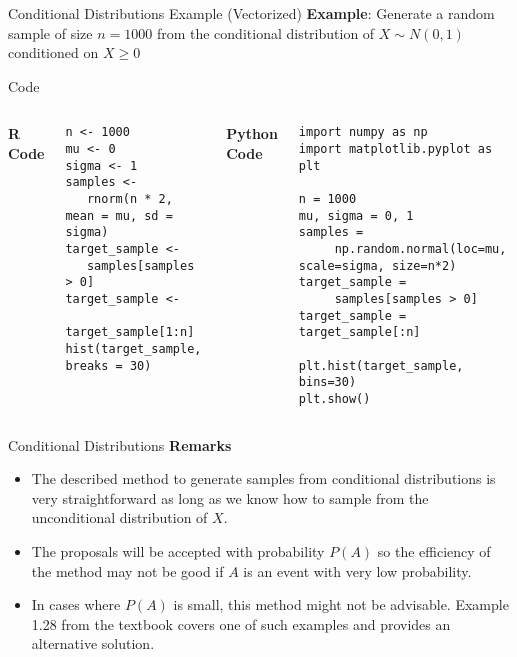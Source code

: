 \documentclass[8pt]{beamer}
\begin{document}
\begin{frame}[fragile]{Conditional Distributions Example (Vectorized)}
\textbf{Example}: Generate a random sample of size $n=1000$ from the conditional distribution of $X \sim N(0,1) $ conditioned on $X\geq 0$

\vspace{2mm}

\alert{Code}
\begin{columns}
\textbf{R Code}

\begin{lstlisting}
n <- 1000
mu <- 0
sigma <- 1
samples <- 
   rnorm(n * 2, mean = mu, sd = sigma)
target_sample <-
   samples[samples > 0]
target_sample <- 
   target_sample[1:n]
hist(target_sample, breaks = 30)
\end{lstlisting}

\textbf{Python Code}

\begin{lstlisting}
import numpy as np
import matplotlib.pyplot as plt

n = 1000
mu, sigma = 0, 1
samples =
     np.random.normal(loc=mu, scale=sigma, size=n*2) 
target_sample = 
     samples[samples > 0]                        
target_sample = target_sample[:n]                         

plt.hist(target_sample, bins=30)
plt.show()
\end{lstlisting}

\end{columns}
\end{frame}

\begin{frame}{Conditional Distributions}
\textbf{Remarks}

\vspace{3mm}

\begin{itemize}
	\item The described method to generate samples from conditional distributions is very straightforward as long as we know how to sample from the unconditional distribution of $X$.
	\item The proposals will be accepted with probability $P(A)$ so the efficiency of the method may not be good if $A$ is an event with very low probability.
	\item In cases where $P(A)$ is small, this method might not be advisable. Example 1.28 from the textbook covers one of such examples and provides an alternative solution.
\end{itemize}
\end{frame}
\end{document}
